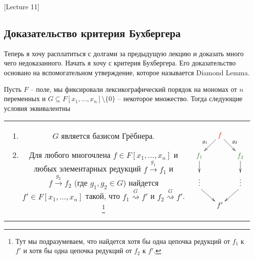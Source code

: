 [Lecture 11]


\subsection{Доказательство критерия Бухбергера}

Теперь я хочу расплатиться с долгами за предыдущую лекцию и доказать много чего недоказанного.
Начать я хочу с критерия Бухбергера.
Его доказательство основано на вспомогательном утверждение, которое называется Diamond Lemma.

\begin{claim}
Пусть $F$ -- поле, мы фиксировали лексикографический порядок на мономах от $n$ переменных и $G\subseteq F[x_1,\ldots,x_n]\setminus\{0\}$ -- некоторое множество.
Тогда следующие условия эквивалентны

\begin{tabular}{cc}
{
\parbox{12cm}{
\begin{enumerate}
\item $G$ является базисом Грёбнера.

\item Для любого многочлена $f\in F[x_1,\ldots,x_n]$ и любых элементарных редукций $f\stackrel{g_1}{\longrightarrow}f_1$ и $f\stackrel{g_2}{\longrightarrow}f_2$ (где $g_1,g_2\in G$) найдется $f'\in F[x_1,\ldots,x_n]$ такой, что $f_1\stackrel{G}{\rightsquigarrow}f'$ и $f_2\stackrel{G}{\rightsquigarrow}f'$.%
\footnote{Тут мы подразумеваем, что найдется хотя бы одна цепочка редукций от $f_1$ к $f'$ и хотя бы одна цепочка редукций от $f_2$ к $f'$.}
\end{enumerate}
}}&{
\parbox{4cm}{
\[
\xymatrix@R=15pt@C=15pt{
	{}&{\textcolor{red}{f}}\ar[dl]_{g_1}\ar[dr]^{g_2}&{}\\
	{\textcolor{OliveGreen}{f_1}}\ar[d]&{}&{\textcolor{OliveGreen}{f_2}}\ar[d]\\
	{}\ar@{}[d]|{\vdots}&{}&{}\ar@{}[d]|{\vdots}\\
	{}\ar[dr]&{}&{}\ar[dl]\\
	{}&{f'}&{}\\
}
\]
}
}
\end{tabular}
\end{claim}
